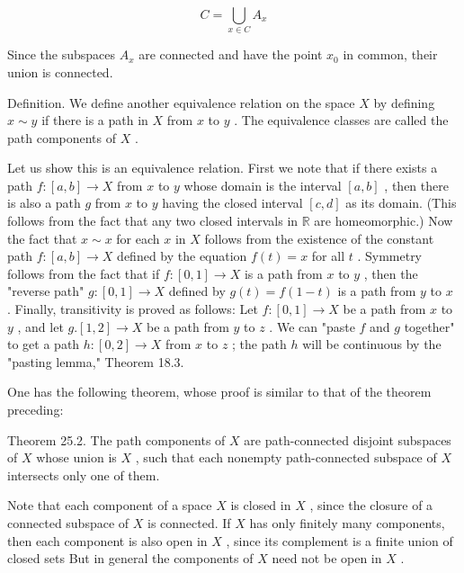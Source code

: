 \[
C = \mathop{\bigcup }\limits_{{x \in  C}}{A}_{x}
\]

Since the subspaces \({A}_{x}\) are connected and have the point \({x}_{0}\) in common, their union is connected.

Definition. We define another equivalence relation on the space \(X\) by defining \(x \sim  y\) if there is a path in \(X\) from \(x\) to \(y\) . The equivalence classes are called the path components of \(X\) .

Let us show this is an equivalence relation. First we note that if there exists a path \(f : \left\lbrack  {a,b}\right\rbrack   \rightarrow  X\) from \(x\) to \(y\) whose domain is the interval \(\left\lbrack  {a,b}\right\rbrack\) , then there is also a path \(g\) from \(x\) to \(y\) having the closed interval \(\left\lbrack  {c,d}\right\rbrack\) as its domain. (This follows from the fact that any two closed intervals in \(\mathbb{R}\) are homeomorphic.) Now the fact that \(x \sim  x\) for each \(x\) in \(X\) follows from the existence of the constant path \(f : \left\lbrack  {a,b}\right\rbrack   \rightarrow  X\) defined by the equation \(f\left( t\right)  = x\) for all \(t\) . Symmetry follows from the fact that if \(f : \left\lbrack  {0,1}\right\rbrack   \rightarrow  X\) is a path from \(x\) to \(y\) , then the "reverse path" \(g : \left\lbrack  {0,1}\right\rbrack   \rightarrow  X\) defined by \(g\left( t\right)  = f\left( {1 - t}\right)\) is a path from \(y\) to \(x\) . Finally, transitivity is proved as follows: Let \(f : \left\lbrack  {0,1}\right\rbrack   \rightarrow  X\) be a path from \(x\) to \(y\) , and let \(g.\left\lbrack  {1,2}\right\rbrack   \rightarrow  X\) be a path from \(y\) to \(z\) . We can "paste \(f\) and \(g\) together" to get a path \(h : \left\lbrack  {0,2}\right\rbrack   \rightarrow  X\) from \(x\) to \(z\) ; the path \(h\) will be continuous by the "pasting lemma," Theorem 18.3.

One has the following theorem, whose proof is similar to that of the theorem preceding:

Theorem 25.2. The path components of \(X\) are path-connected disjoint subspaces of \(X\) whose union is \(X\) , such that each nonempty path-connected subspace of \(X\) intersects only one of them.

Note that each component of a space \(X\) is closed in \(X\) , since the closure of a connected subspace of \(X\) is connected. If \(X\) has only finitely many components, then each component is also open in \(X\) , since its complement is a finite union of closed sets But in general the components of \(X\) need not be open in \(X\) .

